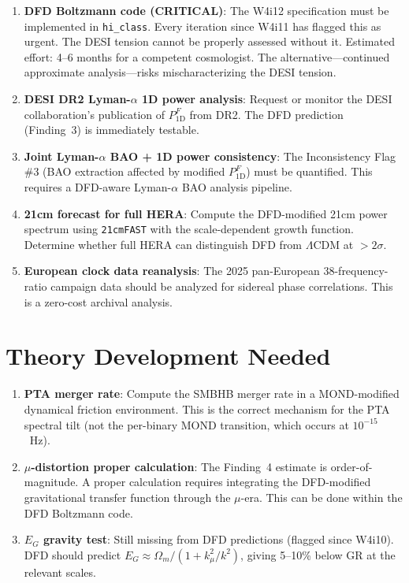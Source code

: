 \documentclass[11pt,a4paper]{article}
\newcommand{\Omm}{\Omega_m}
\newcommand{\LCDM}{$\Lambda$CDM}
\newcommand{\kmu}{k_\mu}
\begin{document}
\begin{enumerate}
\item \textbf{DFD Boltzmann code (CRITICAL)}: The W4i12 specification
  must be implemented in \texttt{hi\_class}. Every iteration since W4i11
  has flagged this as urgent. The DESI tension cannot be properly assessed
  without it. Estimated effort: 4--6 months for a competent cosmologist.
  The alternative---continued approximate analysis---risks mischaracterizing
  the DESI tension.

\item \textbf{DESI DR2 Lyman-$\alpha$ 1D power analysis}: Request or
  monitor the DESI collaboration's publication of $P_{1\text{D}}^F$ from
  DR2. The DFD prediction (Finding~3) is immediately testable.

\item \textbf{Joint Lyman-$\alpha$ BAO + 1D power consistency}: The
  Inconsistency Flag \#3 (BAO extraction affected by modified
  $P_{1\text{D}}^F$) must be quantified. This requires a DFD-aware
  Lyman-$\alpha$ BAO analysis pipeline.

\item \textbf{21cm forecast for full HERA}: Compute the DFD-modified
  21cm power spectrum using \texttt{21cmFAST} with the scale-dependent
  growth function. Determine whether full HERA can distinguish
  DFD from \LCDM{} at $>2\sigma$.

\item \textbf{European clock data reanalysis}: The 2025 pan-European
  38-frequency-ratio campaign data should be analyzed for sidereal
  phase correlations. This is a zero-cost archival analysis.
\end{enumerate}

\section{Theory Development Needed}

\begin{enumerate}
\item \textbf{PTA merger rate}: Compute the SMBHB merger rate in a
  MOND-modified dynamical friction environment. This is the correct
  mechanism for the PTA spectral tilt (not the per-binary MOND
  transition, which occurs at $10^{-15}$~Hz).

\item \textbf{$\mu$-distortion proper calculation}: The Finding~4
  estimate is order-of-magnitude. A proper calculation requires
  integrating the DFD-modified gravitational transfer function through
  the $\mu$-era. This can be done within the DFD Boltzmann code.

\item \textbf{$E_G$ gravity test}: Still missing from DFD predictions
  (flagged since W4i10). DFD should predict $E_G \approx \Omm/(1 +
  \kmu^2/k^2)$, giving 5--10\% below GR at the relevant scales.
\end{enumerate}
\end{document}

